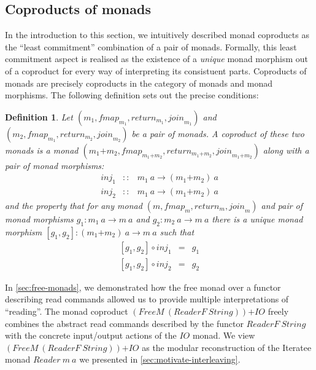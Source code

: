 \documentclass{jfp1}
\newtheorem{definition}{Definition}
\begin{document}
\subsection{Coproducts of monads}
\label{sec:coproducts-of-monads}

\newcommand{\cprd}[2]{#1\mathord{+}#2}

In the introduction to this section, we intuitively described monad
coproducts as the ``least commitment'' combination of a pair of
monads. Formally, this least commitment aspect is realised as the
existence of a \emph{unique} monad morphism out of a coproduct for
every way of interpreting its consistuent parts. Coproducts of monads
are precisely coproducts in the category of monads and monad
morphisms. The following definition sets out the precise conditions:
\begin{definition}\label{defn:coproducts}
  Let $(m_1, \mathit{fmap}_{m_1}, \mathit{return}_{m_1}, \mathit{join}_{m_1})$ and $(m_2,
  \mathit{fmap}_{m_1}, \mathit{return}_{m_2}, \mathit{join}_{m_2})$ be a pair of monads. A \emph{coproduct} of these two monads is a
  monad $(\cprd{m_1}{m_2}, \mathit{fmap}_{\cprd{m_1}{m_2}}, \mathit{return}_{\cprd{m_1}{m_2}},
  \mathit{join}_{\cprd{m_1}{m_2}})$ along with a pair of monad morphisms:
  \begin{displaymath}
    \begin{array}{rcl}
      \mathit{inj}_1 & :: & m_1~a \to (\cprd{m_1}{m_2})~a \\
      \mathit{inj}_2 & :: & m_1~a \to (\cprd{m_1}{m_2})~a
    \end{array}
  \end{displaymath}
  and the property that for any monad $(m,\mathit{fmap}_m,
  \mathit{return}_m, \mathit{join}_m)$ and pair of monad morphisms
  $g_1 : m_1~a \to m~a$ and $g_2 : m_2~a \to m~a$ there is a
  \emph{unique} monad morphism $[g_1,g_2] : (\cprd{m_1}{m_2})~a \to
  m~a$ such that
  \begin{displaymath}
    \begin{array}{rcl}
      {}[g_1,g_2] \circ \mathit{inj}_1 & = & g_1 \\
      {}[g_1,g_2] \circ \mathit{inj}_2 & = & g_2
    \end{array}
  \end{displaymath}
\end{definition}

In \autoref{sec:free-monads}, we demonstrated how the free monad over
a functor describing read commands allowed us to provide multiple
interpretations of ``reading''. 
The monad coproduct
$\cprd{(\mathit{FreeM}~(\mathit{ReaderF}~\mathit{String}))}{\mathit{IO}}$
freely combines the abstract read commands described by the functor
$\mathit{ReaderF}~\mathit{String}$ with the concrete input/output
actions of the $\mathit{IO}$ monad. We view
$\cprd{(\mathit{FreeM}~(\mathit{ReaderF}~\mathit{String}))}{\mathit{IO}}$
as the modular reconstruction of the Iteratee monad
$\mathit{Reader}~m~a$ we presented in
\autoref{sec:motivate-interleaving}.
\end{document}
